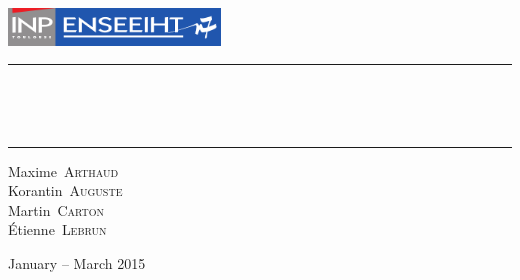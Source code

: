 \begin{titlepage}
  \begin{center}
    \includegraphics[height=1cm]{fig/LogoEnseeiht}\\\vspace{1cm}
    \hrule\vspace{0.5cm}
    \textsc{\Large\thesubtitle}
    \\\vspace{0.5cm}

    \textbf{\huge\thetitle}
    \\\vspace{0.4cm}
    \hrule\vspace{2cm}

    {\large
      Maxime~\textsc{Arthaud}      \\
      Korantin~\textsc{Auguste}    \\
      Martin~\textsc{Carton}       \\
      Étienne~\textsc{Lebrun}
    }

    \vfill
    {\large January -- March 2015}
  \end{center}
\end{titlepage}
